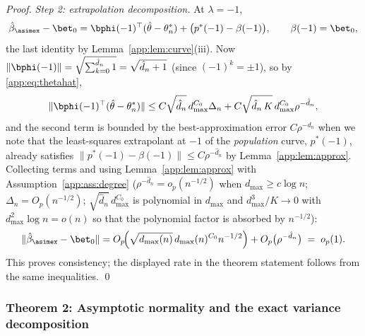\begin{proof}
\emph{Step 2: extrapolation decomposition.} At $\lambda=-1$,
\[
  \hat\beta_{\asimex}-\bet_0
  =\bphi(-1)^\top(\hat\theta-\theta^*_n)
  +\bigl(p^*(-1)-\beta(-1)\bigr),
  \qquad \beta(-1)=\bet_0,
\]
the last identity by Lemma~\ref{app:lem:curve}(iii). Now
$\|\bphi(-1)\|=\sqrt{\sum_{k=0}^{\hat d_n}1}=\sqrt{\hat d_n+1}$ (since
$(-1)^k=\pm 1$), so by \eqref{app:eq:thetahat},
\[
  \|\bphi(-1)^\top(\hat\theta-\theta^*_n)\|
  \le C\sqrt{\hat d_n}\,d_{\max}^{C_0}\Delta_n
    + C\sqrt{\hat d_n\,K}\,d_{\max}^{C_0}\rho^{-\hat d_n},
\]
and the second term is bounded by the best-approximation error
$C\rho^{-\hat d_n}$ when we note that the least-squares extrapolant at
$-1$ of the \emph{population} curve, $p^*(-1)$, already satisfies
$\|p^*(-1)-\beta(-1)\|\le C\rho^{-\hat d_n}$ by
Lemma~\ref{app:lem:approx}. Collecting terms and using
Lemma~\ref{app:lem:approx} with Assumption~\ref{app:ass:degree}
($\rho^{-\hat d_n}=o_p(n^{-1/2})$ when $d_{\max}\ge c\log n$;
$\Delta_n=O_p(n^{-1/2})$; $\sqrt{\hat d_n}\,d_{\max}^{C_0}$ is polynomial
in $d_{\max}$ and $d_{\max}^3/K\to 0$ with $d_{\max}^2\log n=o(n)$
so that the polynomial factor is absorbed by $n^{-1/2}$):
\[
  \|\hat\beta_{\asimex}-\bet_0\|
  =O_p\!\Bigl(\sqrt{d_{\max}(n)}\,d_{\max}(n)^{C_0}n^{-1/2}\Bigr)
   +O_p\bigl(\rho^{-\hat d_n}\bigr)
  \;=\;o_p(1).
\]
This proves consistency; the displayed rate in the theorem statement
follows from the same inequalities. \qed
\end{proof}

\subsubsection{Theorem 2: Asymptotic normality and the exact variance
decomposition}\label{app:sec:an}

